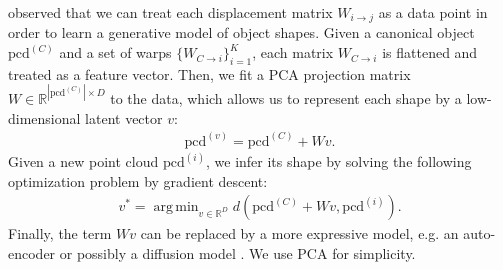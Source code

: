 \documentclass{article}
\DeclareMathOperator*{\argmin}{arg\,min}
\newcommand{\pcx}[1]{\mathrm{pcd}^{(#1)}}
\newcommand{\wxy}[2]{W_{#1 \rightarrow #2}}
\newcommand{\pci}{\pcx{i}}
\newcommand{\pcc}{\pcx{C}}
\newcommand{\wij}{\wxy{i}{j}}
\newcommand{\wci}{\wxy{C}{i}}
\begin{document}
\citet{rodriguez18transferring} observed that we can treat each displacement matrix $\wij$ as a data point in order to learn a generative model of object shapes. Given a canonical object $\pcc$ and a set of warps $\{ \wci \}_{i=1}^K$, each matrix $\wci$ is flattened and treated as a feature vector. Then, we fit a PCA projection matrix $W \in \mathbb{R}^{|\pcc|{\times}D}$ to the data, which allows us to represent each shape by a low-dimensional latent vector $v$:
\begin{align}
    \pcx{v} = \pcc + W v.
\end{align}
Given a new point cloud $\pci$, we infer its shape by solving the following optimization problem by gradient descent:
\begin{align}
    v^* = \argmin_{v \in \mathbb{R}^D} d(\pcc + W v, \pci).
\end{align}
Finally, the term $Wv$ can be replaced by a more expressive model, e.g. an auto-encoder \cite{thompson21shapebased} or possibly a diffusion model \cite{nichol22pointe}. We use PCA for simplicity.



\end{document}
